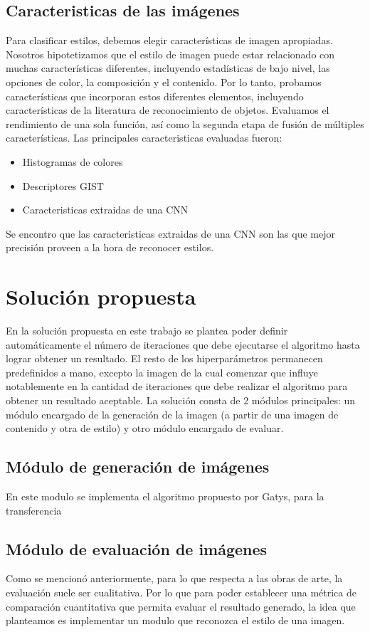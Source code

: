 \documentclass[a4paper,11pt,spanish]{book}
\begin{document}
    \subsection{Caracteristicas de las imágenes}
	Para clasificar estilos, debemos elegir características de imagen apropiadas. Nosotros hipotetizamos que el estilo de imagen puede estar relacionado con muchas características diferentes,
	incluyendo estadísticas de bajo nivel, las opciones de color, la composición y el contenido. Por lo tanto, probamos características que incorporan estos diferentes elementos, incluyendo características de la
	literatura de reconocimiento de objetos. Evaluamos el rendimiento de una sola función, así como la segunda etapa de fusión de múltiples características.
	Las principales caracteristicas evaluadas fueron:
	\begin{itemize}
	 \item Histogramas de colores
	 \item Descriptores GIST
	 \item Caracteristicas extraidas de una CNN
	\end{itemize}
	Se encontro que las caracteristicas extraidas de una CNN son las que mejor precisión proveen a la hora de reconocer estilos.
\fi
  \section{Solución propuesta}
    En la solución propuesta en este trabajo se plantea poder definir automáticamente el número de iteraciones que debe ejecutarse el algoritmo hasta lograr obtener un resultado.
    El resto de los hiperparámetros permanecen predefinidos a mano, excepto la imagen de la cual comenzar que influye notablemente en la cantidad de iteraciones que debe realizar el
    algoritmo para obtener un resultado aceptable.
    La solución consta de 2 módulos principales: un módulo encargado de la generación de la imagen (a partir de una imagen de contenido y otra de estilo) y otro módulo encargado de
    evaluar.
    \subsection{Módulo de generación de imágenes}
      En este modulo se implementa el algoritmo propuesto por Gatys, para la transferencia 
    \subsection{Módulo de evaluación de imágenes}
      Como se mencionó anteriormente, para lo que respecta a las obras de arte, la evaluación suele ser cualitativa. Por lo que para poder establecer una métrica de comparación cuantitativa
      que permita evaluar el resultado generado, la idea que planteamos es implementar un modulo que reconozca el estilo de una imagen.
\end{document}
